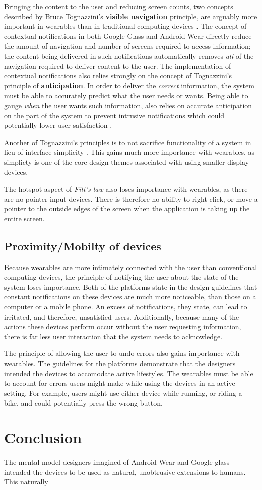 \documentclass[12pt]{article}
\begin{document}
Bringing the content to the user and reducing screen counts, two concepts described by Bruce Tognazzini's \textbf{visible navigation} principle, are arguably more important in wearables than in traditional computing devices \cite{tog}. The concept of contextual notifications in both Google Glass and Android Wear directly reduce the amount of navigation and number of screens required to access information; the content being delivered in such notifications automatically removes \textit{all} of the navigation required to deliver content to the user. The implementation of contextual notifications also relies strongly on the concept of Tognazzini's principle of \textbf{anticipation}. In order to deliver the \textit{correct} information, the system must be able to accurately predict what the user needs or wants. Being able to gauge \textit{when} the user wants such information, also relies on accurate anticipation on the part of the system to prevent intrusive notifications which could potentially lower user satisfaction \cite{tog}.

Another of Tognazzini's principles is to not sacrifice functionality of a system in lieu of interface simplicity \cite{tog}. This gains much more importance with wearables, as simplicty is one of the core design themes associated with using smaller display devices.

The hotspot aspect of \textit{Fitt's law} also loses importance with wearables, as there are no pointer input devices. There is therefore no ability to right click, or move a pointer to the outside edges of the screen when the application is taking up the entire screen.

\subsection{Proximity/Mobilty of devices}
Because wearables are more intimately connected with the user than conventional computing devices, the principle of notifying the user about the state of the system loses importance. Both of the platforms state in the design guidelines that constant notifications on these devices are much more noticeable, than those on a computer or a mobile phone. An excess of notifications, they state, can lead to irritated, and therefore, unsatisfied users. Additionally, because many of the actions these devices perform occur without the user requesting information, there is far less user interaction that the system needs to acknowledge. 

The principle of allowing the user to undo errors also gains importance with wearables. The guidelines for the platforms demonstrate that the designers intended the devices to accomodate active lifestyles.  The wearables must be able to account for errors users might make while using the devices in an active setting. For example, users might use either device while running, or riding a bike, and could potentially press the wrong button.

\section{Conclusion}
The mental-model designers imagined of Android Wear and Google glass intended the devices to be used as natural, unobtrusive extensions to humans. This naturally 



\end{document}
